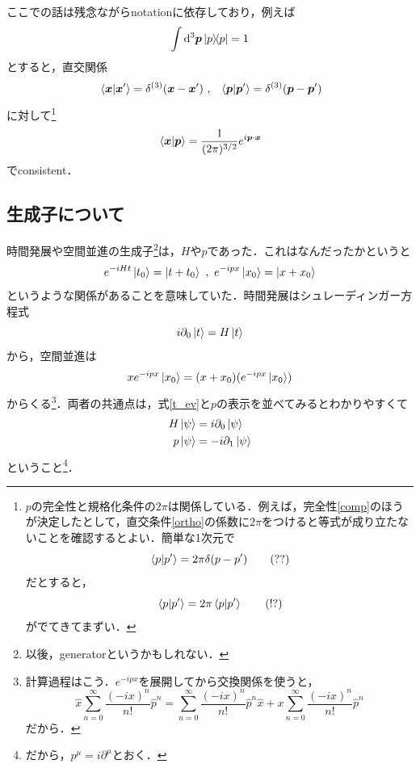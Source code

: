 \documentclass[a4paper,pdflatex,ja=standard]{bxjsarticle}
\begin{document}
ここでの話は残念ながらnotationに依存しており，例えば
\begin{equation}
  \int\dd^3 \bm{p}\ketbra{p}{p}=1
\end{equation}
とすると，直交関係
\begin{equation}
  \ev*{\bm{x}|\bm{x}'}=\delta^{(3)}(\bm{x}-\bm{x}')
  \ ,\ \ 
  \ev*{\bm{p}|\bm{p}'}=\delta^{(3)}(\bm{p}-\bm{p}')
  \label{ortho}
\end{equation}
に対して\footnote{
  $p$の完全性と規格化条件の$2\pi$は関係している．例えば，完全性\eqref{comp}のほうが決定したとして，直交条件\eqref{ortho}の係数に$2\pi$をつけると等式が成り立たないことを確認するとよい．簡単な1次元で
  \begin{equation}
    \ev*{p|p'}=2\pi\delta(p-p')
    \tag{??}
  \end{equation}
  だとすると，
  \begin{equation}
    \ev*{p|p'}
    =
    2\pi\ev*{p|p'}
    \tag{!?}
  \end{equation}
  がでてきてまずい．
}
\begin{equation}
  \ev*{\bm{x}|\bm{p}}
  =
  \frac{1}{(2\pi)^{3/2}}e^{i\bm{p}\cdot\bm{x}}
\end{equation}
でconsistent．

\subsection{生成子について}

時間発展や空間並進の生成子\footnote{
  以後，generatorというかもしれない．
}は，$H$や$p$であった．これはなんだったかというと
\begin{equation}
  e^{-iHt}\ket{t_{0}}=\ket{t+t_{0}}
  \ ,\ 
  e^{-ipx}\ket{x_{0}}=\ket{x+x_{0}}
\end{equation}
というような関係があることを意味していた．時間発展はシュレーディンガー方程式
\begin{equation}
  i\partial_{0}\ket{t}
  =
  H\ket{t}
  \label{t_ev}
\end{equation}
から，空間並進は
\begin{equation}
  xe^{-ipx}\ket{x_{0}}
  =
  (x+x_{0})(e^{-ipx}\ket{x_{0}})
\end{equation}
からくる\footnote{
  計算過程はこう．$e^{-ipx}$を展開してから交換関係を使うと，
  \begin{equation}
    \hat{x}\sum_{n=0}^{\infty}\frac{(-ix)^n}{n!}\hat{p}^{n}
    =
    \sum_{n=0}^{\infty}\frac{(-ix)^n}{n!}\hat{p}^{n}\hat{x}
    +
    x\sum_{n=0}^{\infty}\frac{(-ix)^n}{n!}\hat{p}^{n}
    \nonumber
  \end{equation}
  だから．
}．両者の共通点は，式\eqref{t_ev}と$p$の表示を並べてみるとわかりやすくて
\begin{align}
  H\ket{\psi}
  &=
  i\partial_{0}\ket{\psi}
  \\
  p\ket{\psi}
  &=
  -i\partial_{1}\ket{\psi}
\end{align}
ということ\footnote{
  だから，$p^{\mu}=i\partial^{\mu}$とおく．
}．
\\
\end{document}
